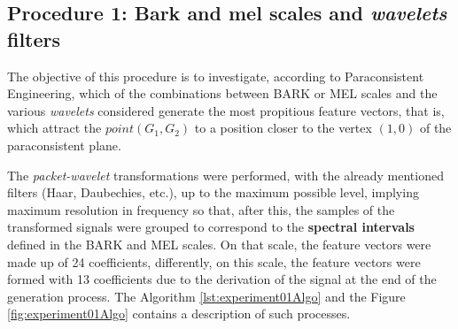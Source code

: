 		\subsection{Procedure 1: Bark and mel scales and \textit{wavelets} filters}
			\label{sec:propApproach:subsec:Experiment1}
			\par The objective of this procedure is to investigate, according to Paraconsistent Engineering, which of the combinations between BARK or MEL scales and the various \textit{wavelets} considered generate the most propitious feature vectors, that is, which attract the $point(G_1, G_2)$ to a position closer to the vertex $(1,0)$ of the paraconsistent plane.
			
			\par The \textit{packet-wavelet} transformations were performed, with the already mentioned filters (Haar, Daubechies, etc.), up to the maximum possible level, implying maximum resolution in frequency so that, after this, the samples of the transformed signals were grouped to correspond to the \textbf{spectral intervals} defined in the BARK and MEL scales. On that scale, the feature vectors were made up of 24 coefficients, differently, on this scale, the feature vectors were formed with 13 coefficients due to the derivation of the signal at the end of the generation process. The Algorithm \ref{lst:experiment01Algo} and the Figure \ref{fig:experiment01Algo} contains a description of such processes.
			
			
			
